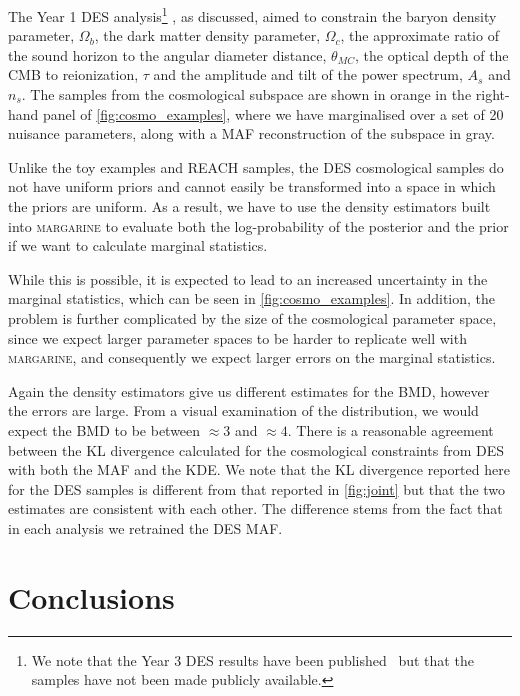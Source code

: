 The Year 1 DES analysis\footnote{We note that the Year 3 DES results have been published~\cite{DES_year3, DES_year3_2021} but that the samples have not been made publicly available.} \cite{Handley_tensions_2019}, as discussed, aimed to constrain the baryon density parameter, $\Omega_b$, the dark matter density parameter, $\Omega_c$, the approximate ratio of the sound horizon to the angular diameter distance, $\theta_{MC}$, the optical depth of the CMB to reionization, $\tau$ and the amplitude and tilt of the power spectrum, $A_s$ and $n_s$. The samples from the cosmological subspace are shown in orange in the right-hand panel of \cref{fig:cosmo_examples}, where we have marginalised over a set of 20 nuisance parameters, along with a MAF reconstruction of the subspace in gray.

Unlike the toy examples and REACH samples, the DES cosmological samples do not have uniform priors and cannot easily be transformed into a space in which the priors are uniform. As a result, we have to use the density estimators built into \textsc{margarine} to evaluate both the log-probability of the posterior and the prior if we want to calculate marginal statistics.

While this is possible, it is expected to lead to an increased uncertainty in the marginal statistics, which can be seen in \cref{fig:cosmo_examples}. In addition, the problem is further complicated by the size of the cosmological parameter space, since we expect larger parameter spaces to be harder to replicate well with \textsc{margarine}, and consequently we expect larger errors on the marginal statistics.

Again the density estimators give us different estimates for the BMD, however the errors are large. From a visual examination of the distribution, we would expect the BMD to be between $\approx3$ and $\approx4$. There is a reasonable agreement between the KL divergence calculated for the cosmological constraints from DES with both the MAF and the KDE. We note that the KL divergence reported here for the DES samples is different from that reported in \cref{fig:joint} but that the two estimates are consistent with each other. The difference stems from the fact that in each analysis we retrained the DES MAF.

\section{Conclusions}
\label{sec:conclusions_margarine}

